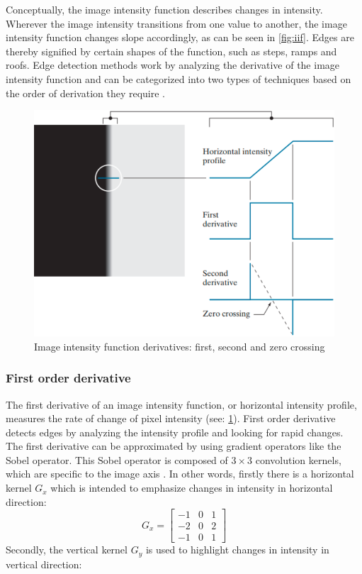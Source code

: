 \noindent
Conceptually, the image intensity function describes changes in intensity.
Wherever the image intensity transitions from one value to another,
the image intensity function changes slope accordingly, as can be seen in \cref{fig:iif}.
Edges are thereby signified by certain shapes of the function, such as steps, ramps and roofs.
Edge detection methods work by analyzing the derivative of the image intensity function and
can be categorized into two types of techniques based on the order of derivation they require \cite{gonzalezDigitalImageProcessing2007}.
\begin{figure}[h]
	\centerline{\includegraphics[scale=0.5]{images/edgeModelOrders.png}}
	\caption{Image intensity function derivatives: first, second and zero crossing \cite{gonzalezDigitalImageProcessing2007}}\label{fig:iifO}
\end{figure}

\noindent
\subsubsection*{First order derivative}
The first derivative of an image intensity function, or horizontal intensity profile,
measures the rate of change of pixel intensity (see: \cref{fig:iifO}).
First order derivative detects edges by analyzing the intensity profile and looking for rapid changes.
The first derivative can be approximated by using gradient operators like the Sobel operator.
This Sobel operator is composed of $3 \times 3$ convolution kernels,
which are specific to the image axis \cite{gonzalezDigitalImageProcessing2007}.
In other words, firstly there is a horizontal kernel $G_{x}$ which is intended to emphasize changes in
intensity in horizontal direction:
\begin{equation}
	G_{x} =
	\begin{bmatrix}
		-1 & 0 & 1 \\
		-2 & 0 & 2 \\
		-1 & 0 & 1
	\end{bmatrix}
\end{equation}
\noindent
Secondly, the vertical kernel $G_{y}$ is used to highlight changes in intensity in vertical direction:


